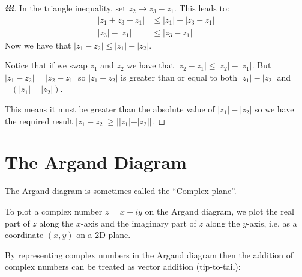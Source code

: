 \documentclass[../main.tex]{subfiles}
\begin{document}
\begin{proof}[\textbf{iii}]
  In the triangle inequality, set $z_2 \to z_3 - z_1$.
  This leads to:
  \begin{align*}
    |z_1 + z_3 - z_1| &\leq |z_1| + |z_3 - z_1|\\
    |z_3| - |z_1| &\leq |z_3 - z_1|
  \end{align*}
  Now we have that $|z_1 - z_2| \leq |z_1| - |z_2|$.

  Notice that if we swap $z_1$ and $z_2$ we have that $|z_2 - z_1| \leq |z_2| - |z_1|$.
  But $|z_1 - z_2| = |z_2 - z_1|$ so $|z_1 - z_2|$ is greater than or equal to both $|z_1| - |z_2|$ and $-(|z_1| - |z_2|)$.

  This means it must be greater than the absolute value of $|z_1| - |z_2|$ so we have the required result $|z_1 - z_2| \geq ||z_1| - |z_2||$.
\end{proof}
\section{The Argand Diagram}
The Argand diagram is sometimes called the ``Complex plane''.

To plot a complex number $z = x + iy$ on the Argand diagram, we plot the real part of $z$ along the $x$-axis and the imaginary part of $z$ along the $y$-axis, i.e. as a coordinate $(x, y)$ on a 2D-plane.
\begin{center}
\end{center}

By representing complex numbers in the Argand diagram then the addition of complex numbers can be treated as vector addition (tip-to-tail):
\begin{center}
\end{center}
\end{document}
